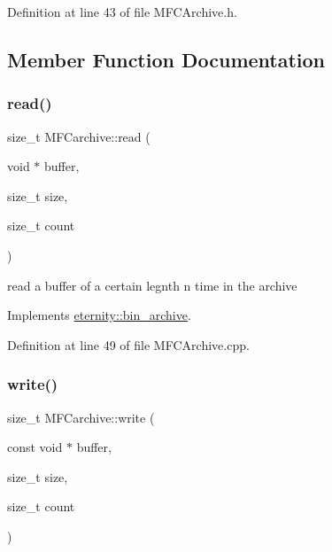 Definition at line 43 of file M\+F\+C\+Archive.\+h.



\subsection{Member Function Documentation}
\mbox{\label{class_m_f_carchive_a175a083e8f81fe490714be920539f7b9}} 
\subsubsection{\texorpdfstring{read()}{read()}}
{\footnotesize\ttfamily size\+\_\+t M\+F\+Carchive\+::read (\begin{DoxyParamCaption}\item[{void $\ast$}]{buffer,  }\item[{size\+\_\+t}]{size,  }\item[{size\+\_\+t}]{count }\end{DoxyParamCaption})\hspace{0.3cm}{\ttfamily [virtual]}}



read a buffer of a certain legnth n time in the archive 



Implements \hyperlink{classeternity_1_1bin__archive_a5d67b032541f5a1e104d2fcd0eaa7a55}{eternity\+::bin\+\_\+archive}.



Definition at line 49 of file M\+F\+C\+Archive.\+cpp.

\mbox{\label{class_m_f_carchive_a8c5191701a84b9a4d2812887cfc28651}} 
\subsubsection{\texorpdfstring{write()}{write()}}
{\footnotesize\ttfamily size\+\_\+t M\+F\+Carchive\+::write (\begin{DoxyParamCaption}\item[{const void $\ast$}]{buffer,  }\item[{size\+\_\+t}]{size,  }\item[{size\+\_\+t}]{count }\end{DoxyParamCaption})\hspace{0.3cm}{\ttfamily [virtual]}}




